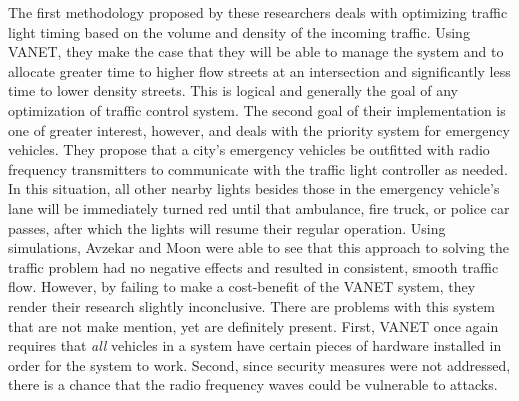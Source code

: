The first methodology proposed by these researchers deals with optimizing traffic light timing based on the volume and density of the incoming traffic.  Using VANET, they make the case that they will be able to manage the system and to allocate greater time to higher flow streets at an intersection and significantly less time to lower density streets.  This is logical and generally the goal of any optimization of traffic control system.  The second goal of their implementation is one of greater interest, however, and deals with the priority system for emergency vehicles.  They propose that a city's emergency vehicles be outfitted with radio frequency transmitters to communicate with the traffic light controller as needed.  In this situation, all other nearby lights besides those in the emergency vehicle's lane will be immediately turned red until that ambulance, fire truck, or police car passes, after which the lights will resume their regular operation.  Using simulations, Avzekar and Moon were able to see that this approach to solving the traffic problem had no negative effects and resulted in consistent, smooth traffic flow.  However, by failing to make a cost-benefit of the VANET system, they render their research slightly inconclusive\cite{V2I}.  There are problems with this system that are not make mention, yet are definitely present.  First, VANET once again requires that \textit{all} vehicles in a system have certain pieces of hardware installed in order for the system to work.  Second, since security measures were not addressed, there is a chance that the radio frequency waves could be vulnerable to attacks. 


